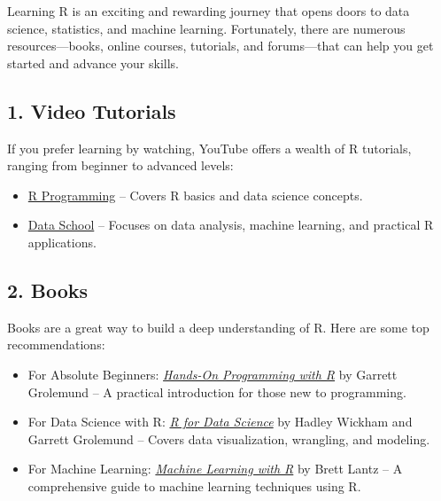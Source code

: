 \documentclass[
  11pt,
]{book}
\providecommand{\tightlist}{%
  \setlength{\itemsep}{0pt}\setlength{\parskip}{0pt}}
\theoremstyle{definition}
\theoremstyle{definition}
\theoremstyle{definition}
\theoremstyle{definition}
\theoremstyle{remark}
\begin{document}
Learning R is an exciting and rewarding journey that opens doors to data science, statistics, and machine learning. Fortunately, there are numerous resources---books, online courses, tutorials, and forums---that can help you get started and advance your skills.

\subsection*{1. Video Tutorials}\label{video-tutorials}


If you prefer learning by watching, YouTube offers a wealth of R tutorials, ranging from beginner to advanced levels:

\begin{itemize}
\tightlist
\item
  \href{https://www.youtube.com/channel/UCJ7w9dVjTOJi8Z7j0y9v6Qw}{R Programming} -- Covers R basics and data science concepts.\\
\item
  \href{https://www.youtube.com/user/dataschool}{Data School} -- Focuses on data analysis, machine learning, and practical R applications.
\end{itemize}

\subsection*{2. Books}\label{books}


Books are a great way to build a deep understanding of R. Here are some top recommendations:

\begin{itemize}
\tightlist
\item
  For Absolute Beginners: \href{https://rstudio-education.github.io/hopr/}{\emph{Hands-On Programming with R}} by Garrett Grolemund\citep{grolemund2014hands} -- A practical introduction for those new to programming.\\
\item
  For Data Science with R: \href{https://r4ds.had.co.nz}{\emph{R for Data Science}} by Hadley Wickham and Garrett Grolemund \citep{wickham2017r} -- Covers data visualization, wrangling, and modeling.\\
\item
  For Machine Learning: \href{https://www.packtpub.com/product/machine-learning-with-r/9781782162148}{\emph{Machine Learning with R}} by Brett Lantz\citep{lantz2013machine} -- A comprehensive guide to machine learning techniques using R.
\end{itemize}
\end{document}
